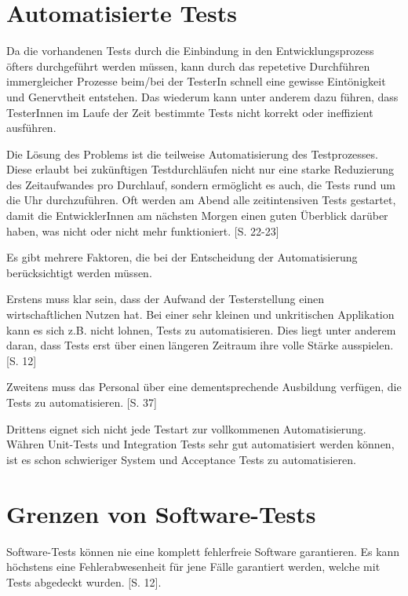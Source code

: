 \documentclass[a4paper,bibtotoc,oneside]{scrbook}
\begin{document}
\section{Automatisierte Tests}
Da die vorhandenen Tests durch die Einbindung in den Entwicklungsprozess öfters durchgeführt werden müssen, kann durch das repetetive Durchführen immergleicher Prozesse beim/bei der TesterIn schnell eine gewisse Eintönigkeit und Genervtheit entstehen. Das wiederum kann unter anderem dazu führen, dass TesterInnen im Laufe der Zeit bestimmte Tests nicht korrekt oder ineffizient ausführen. 

Die Lösung des Problems ist die teilweise Automatisierung des Testprozesses. Diese erlaubt bei zukünftigen Testdurchläufen nicht nur eine starke Reduzierung des Zeitaufwandes pro Durchlauf, sondern ermöglicht es auch, die Tests rund um die Uhr durchzuführen. Oft werden am Abend alle zeitintensiven Tests gestartet, damit die EntwicklerInnen am nächsten Morgen einen guten Überblick darüber haben, was nicht oder nicht mehr funktioniert. \cite{test_auto}[S. 22-23]

Es gibt mehrere Faktoren, die bei der Entscheidung der Automatisierung berücksichtigt werden müssen. 


Erstens muss klar sein, dass der Aufwand der Testerstellung einen wirtschaftlichen Nutzen hat. Bei einer sehr kleinen und unkritischen Applikation kann es sich z.B. nicht lohnen, Tests zu automatisieren. Dies liegt unter anderem daran, dass Tests erst über einen längeren Zeitraum ihre volle Stärke ausspielen. \cite{eval_regression}[S. 12]

Zweitens muss das Personal über eine dementsprechende Ausbildung verfügen, die Tests zu automatisieren. \cite{eval_automat_webapp_test}[S. 37]

Drittens eignet sich nicht jede Testart zur vollkommenen Automatisierung. Währen Unit-Tests und Integration Tests sehr gut automatisiert werden können, ist es schon schwieriger System und Acceptance Tests zu automatisieren. 

\section{Grenzen von Software-Tests}
Software-Tests können nie eine komplett fehlerfreie Software garantieren. Es kann höchstens eine Fehlerabwesenheit für jene Fälle garantiert werden, welche mit Tests abgedeckt wurden. \cite{eval_regression}[S. 12]. 
\end{document}

